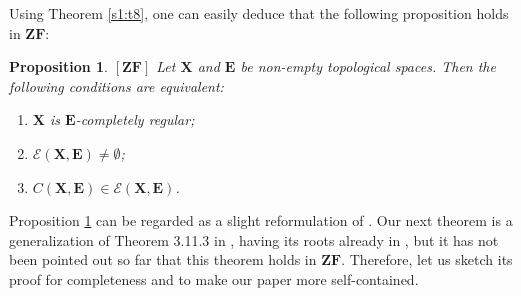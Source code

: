 \documentclass[12pt,twoside,leqno]{article}
\theoremstyle{plain}
\newtheorem{proposition}[theorem]{Proposition}
\theoremstyle{definition}
\theoremstyle{remark}
\begin{document}
Using Theorem \ref{s1:t8}, one can easily deduce that the following proposition holds in $\mathbf{ZF}$:

\begin{proposition}
	\label{s4:p1}
	$[\mathbf{ZF}]$
	Let $\mathbf{X}$ and $\mathbf{E}$ be non-empty topological spaces. Then the following conditions are equivalent:
	\begin{enumerate}
		\item[(i)] $\mathbf{X}$ is $\mathbf{E}$-completely regular;
		\item[(ii)] $\mathcal{E}(\mathbf{X}, \mathbf{E})\neq\emptyset$;
		\item[(ii)]  $C(\mathbf{X},\mathbf{E})\in\mathcal{E}(\mathbf{X}, \mathbf{E})$. 
	\end{enumerate}
\end{proposition} 

Proposition \ref{s4:p1} can be regarded as a slight reformulation of \cite[Theorem 3.8]{mr2}. Our next theorem is a generalization of Theorem 3.11.3 in \cite{en}, having its roots already in \cite{sh},  but it has not been pointed out so far that this theorem holds in $\mathbf{ZF}$. Therefore, let us sketch its proof for completeness and to make our paper more self-contained.
\end{document}

